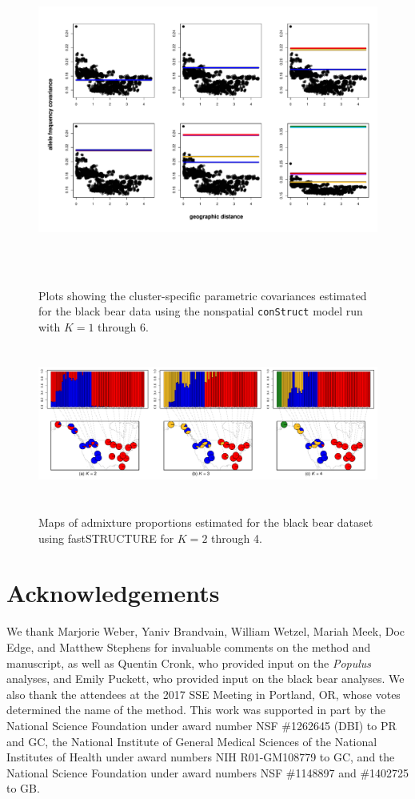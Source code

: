 \documentclass[10pt,letterpaper]{article}
\begin{document}
\begin{figure}
	\centering
		{\includegraphics[width=6in,height=4in]{figs/bears/bear_nsp_layer_covs.pdf}}
	\caption{
	Plots showing the cluster-specific parametric covariances 
	estimated for the black bear data using 
	the nonspatial \texttt{conStruct} model run with $K=1$ through 6.
    }\label{bear_nsp_layer_covs}
\end{figure}

\begin{figure}
	\centering
		{\includegraphics[width=6in,height=2in]{figs/bears/bear_fastStr_results.pdf}}
	\caption{
	Maps of admixture proportions estimated for the black bear dataset 
	using fastSTRUCTURE \cite{fastStructure} for $K=2$ through 4.
    }\label{bear_fastStr}
\end{figure}

\section*{Acknowledgements}

We thank Marjorie Weber, Yaniv Brandvain, William Wetzel, 
Mariah Meek, Doc Edge, and Matthew Stephens 
for invaluable comments on the method and manuscript, 
as well as Quentin Cronk, who provided input on the \textit{Populus} analyses, 
and Emily Puckett, who provided input on the black bear analyses.
We also thank the attendees at the 2017 SSE Meeting in Portland, OR, 
whose votes determined the name of the method.
This work was supported in part by 
the National Science Foundation under award number NSF \#1262645 (DBI) to PR and GC, 
the National Institute of General Medical Sciences of the National
Institutes of Health under award numbers NIH R01-GM108779 to GC,
and the National Science Foundation under award numbers NSF \#1148897 and \#1402725 to GB.

\newpage
\clearpage

\end{document}

